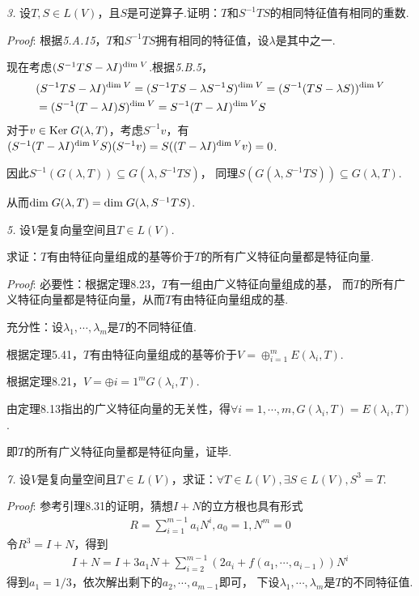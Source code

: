 \newpage

\textit{3.}
设$T,S \in L(V)$，且$S$是可逆算子.证明：$T$和$S^{-1}TS$的相同特征值有相同的重数.

\textit{Proof}:
根据\textit{5.A.15}，$T$和$S^{-1}TS$拥有相同的特征值，设$\lambda$是其中之一.

现在考虑$(S^{-1}TS-\lambda I)^{\mathrm{dim \;} V}$.根据\textit{5.B.5}，
    \begin{align*}
        &(S^{-1}TS-\lambda I)^{\mathrm{dim \;} V}=(S^{-1}TS-\lambda S^{-1}S)^{\mathrm{dim \;} V}=(S^{-1}(TS-\lambda S))^{\mathrm{dim \;} V} \\
        &=(S^{-1}(T-\lambda I)S)^{\mathrm{dim \;} V}=S^{-1}(T-\lambda I)^{\mathrm{dim \;} V}S
    \end{align*}
对于$v \in \mathrm{Ker \;} G(\lambda,T)$，考虑$S^{-1}v$，有
$(S^{-1}(T-\lambda I)^{\mathrm{dim \;} V}S)(S^{-1}v)=S((T-\lambda I)^{\mathrm{dim \;} V}v)=0$.

因此$S^{-1}(G(\lambda,T)) \subseteq G(\lambda,S^{-1}TS)$，
同理$S(G(\lambda,S^{-1}TS)) \subseteq G(\lambda,T)$.

从而$\mathrm{dim \;} G(\lambda,T)=\mathrm{dim \;} G(\lambda,S^{-1}TS)$.

\hspace*{\fill}

\textit{5.}
设$V$是复向量空间且$T \in L(V)$.

求证：$T$有由特征向量组成的基等价于$T$的所有广义特征向量都是特征向量.

\textit{Proof}:
必要性：根据定理8.23，$T$有一组由广义特征向量组成的基，
而$T$的所有广义特征向量都是特征向量，从而$T$有由特征向量组成的基.

充分性：设$\lambda_1,\cdots,\lambda_m$是$T$的不同特征值.

根据定理5.41，$T$有由特征向量组成的基等价于$V=\oplus_{i=1}^m E(\lambda_i,T)$.

根据定理8.21，$V=\oplus{i=1}^m G(\lambda_i,T)$.

由定理8.13指出的广义特征向量的无关性，得$\forall i=1,\cdots,m,G(\lambda_i,T)=E(\lambda_i,T)$.

即$T$的所有广义特征向量都是特征向量，证毕.

\hspace*{\fill}

\textit{7.}
设$V$是复向量空间且$T \in L(V)$，求证：$\forall T \in L(V),\exists S \in L(V),S^3=T$.

\textit{Proof}:
参考引理8.31的证明，猜想$I+N$的立方根也具有形式
    \begin{align*}
        R=\sum_{i=1}^{m-1} a_iN^i,a_0=1,N^m=0
    \end{align*}
令$R^3=I+N$，得到
    \begin{align*}
        I+N=I+3a_1N+\sum_{i=2}^{m-1} (2a_i+f(a_1,\cdots,a_{i-1}))N^i
    \end{align*}
得到$a_1=1/3$，依次解出剩下的$a_2,\cdots,a_{m-1}$即可，
下设$\lambda_1,\cdots,\lambda_m$是$T$的不同特征值.

